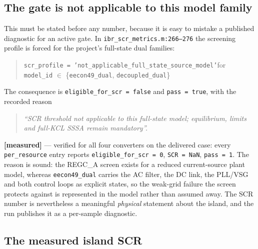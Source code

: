 \documentclass[12pt,a4paper]{article}
\theoremstyle{remark}
\newcommand{\code}[1]{\texttt{\small #1}}
\newcommand{\measured}{\textcolor{ok}{\textbf{[measured]}}}
\begin{document}
\subsection{The gate is not applicable to this model family}

This must be stated before any number, because it is easy to mistake a published
diagnostic for an active gate. In \code{ibr\_scr\_metrics.m:266--276} the
screening profile is forced for the project's full-state dual families:

\begin{quote}\small
\code{scr\_profile = 'not\_applicable\_full\_state\_source\_model'}\quad for
\code{model\_id} $\in$ \{\code{eecon49\_dual}, \code{decoupled\_dual}\}
\end{quote}

The consequence is \code{eligible\_for\_scr = false} and \code{pass = true}, with
the recorded reason

\begin{quote}\small\itshape
``SCR threshold not applicable to this full-state model; equilibrium, limits and
full-KCL SSSA remain mandatory''.
\end{quote}

\measured{} --- verified for all four converters on the delivered case: every
\code{per\_resource} entry reports \code{eligible\_for\_scr = 0},
\code{SCR = NaN}, \code{pass = 1}. The reason is sound: the REGC\_A screen exists
for a reduced current-source plant model, whereas \code{eecon49\_dual} carries
the AC filter, the DC link, the PLL/VSG and both control loops as explicit
states, so the weak-grid failure the screen protects against is represented in
the model rather than assumed away. The SCR number is nevertheless a meaningful
\emph{physical} statement about the island, and the run publishes it as a
per-sample diagnostic.

\subsection{The measured island SCR}
\end{document}
